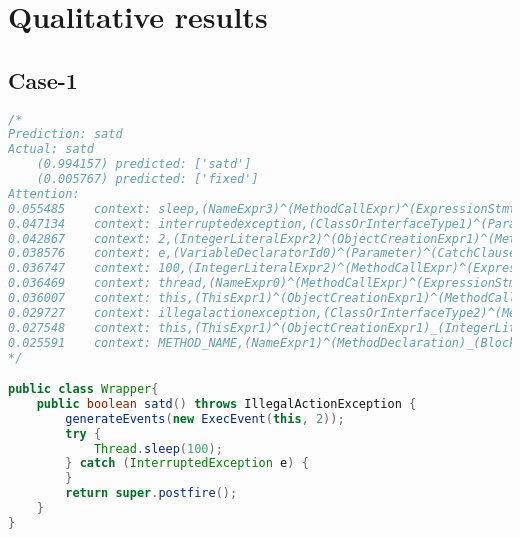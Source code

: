 \section{Qualitative results}\label{app:qualitative} 

\subsection{Case-1}

\begin{lstlisting}[basicstyle=\tiny,caption={Case-1 SATD}, label={},language=Java,breaklines=true,
  postbreak=\mbox{\textcolor{red}{$\hookrightarrow$}\space}]
/*
Prediction:	satd
Actual:	satd
	(0.994157) predicted: ['satd']
	(0.005767) predicted: ['fixed']
Attention:
0.055485	context: sleep,(NameExpr3)^(MethodCallExpr)^(ExpressionStmt)^(BlockStmt)^(TryStmt)^(BlockStmt)_(ReturnStmt)_(MethodCallExpr0)_(NameExpr2),postfire
0.047134	context: interruptedexception,(ClassOrInterfaceType1)^(Parameter)^(CatchClause)^(TryStmt)^(BlockStmt)_(ReturnStmt)_(MethodCallExpr0)_(NameExpr2),postfire
0.042867	context: 2,(IntegerLiteralExpr2)^(ObjectCreationExpr1)^(MethodCallExpr)^(ExpressionStmt)^(BlockStmt)_(ReturnStmt)_(MethodCallExpr0)_(NameExpr2),postfire
0.038576	context: e,(VariableDeclaratorId0)^(Parameter)^(CatchClause)^(TryStmt)^(BlockStmt)_(ReturnStmt)_(MethodCallExpr0)_(NameExpr2),postfire
0.036747	context: 100,(IntegerLiteralExpr2)^(MethodCallExpr)^(ExpressionStmt)^(BlockStmt)^(TryStmt)^(BlockStmt)_(ReturnStmt)_(MethodCallExpr0)_(NameExpr2),postfire
0.036469	context: thread,(NameExpr0)^(MethodCallExpr)^(ExpressionStmt)^(BlockStmt)^(TryStmt)^(BlockStmt)_(ReturnStmt)_(MethodCallExpr0)_(NameExpr2),postfire
0.036007	context: this,(ThisExpr1)^(ObjectCreationExpr1)^(MethodCallExpr)^(ExpressionStmt)^(BlockStmt)_(ReturnStmt)_(MethodCallExpr0)_(NameExpr2),postfire
0.029727	context: illegalactionexception,(ClassOrInterfaceType2)^(MethodDeclaration)_(BlockStmt)_(ExpressionStmt)_(MethodCallExpr0)_(ObjectCreationExpr)_(IntegerLiteralExpr2),2
0.027548	context: this,(ThisExpr1)^(ObjectCreationExpr1)_(IntegerLiteralExpr2),2
0.025591	context: METHOD_NAME,(NameExpr1)^(MethodDeclaration)_(BlockStmt)_(ExpressionStmt)_(MethodCallExpr0)_(ObjectCreationExpr)_(IntegerLiteralExpr2),2
*/

public class Wrapper{
    public boolean satd() throws IllegalActionException {
        generateEvents(new ExecEvent(this, 2));
        try {
            Thread.sleep(100);
        } catch (InterruptedException e) {
        }
        return super.postfire();
    }
}
\end{lstlisting}

